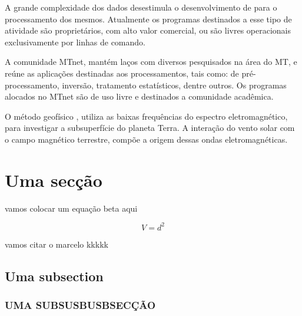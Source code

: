 \documentclass[12pt,twoside,oneright,a4paper,chapter=TITLE,english,brazil]{unipampa}
\begin{document}
    A grande complexidade dos dados desestimula o desenvolvimento de para o processamento dos mesmos. Atualmente os programas destinados a esse tipo de atividade são proprietários,\cite{cagniard1953basic} com alto valor comercial, ou são livres operacionais exclusivamente por linhas de comando.  
    
    A comunidade MTnet, mantém laços com diversos pesquisados na área do MT, e reúne as aplicações destinadas aos processamentos, tais como:  de pré-processamento, inversão, tratamento estatísticos, dentre outros. Os programas alocados no MTnet são de uso livre e destinados a comunidade acadêmica.
    
     O método geofísico , utiliza as baixas frequências do espectro eletromagnético, para investigar a subsuperfície do planeta Terra. A interação do vento solar com o campo magnético terrestre, compõe a origem dessas ondas eletromagnéticas.
     

    \section{Uma secção}
        vamos colocar um equação beta aqui 
        
        \begin{equation}
         V = d^2
        \end{equation}
        
        vamos citar o marcelo kkkkk \cite{padua2004estudos}

    
    \subsection{Uma subsection}
    \subsubsection{UMA SUBSUSBUSBSECÇÃO}
\end{document}
